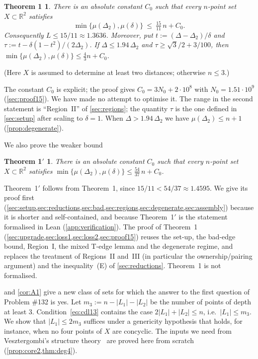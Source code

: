\documentclass[11pt]{amsart}
\newtheorem*{mainthm}{Theorem 1}
\newtheorem*{mainthmp}{Theorem 1$'$}
\theoremstyle{definition}
\theoremstyle{remark}
\newcommand{\R}{\mathbb{R}}
\newcommand{\Dt}{\Delta_2}
\newcommand{\mult}{\mu}
\begin{document}
\begin{mainthm}
There is an absolute constant $C_0$ such that every $n$-point set $X\subset\R^2$ satisfies
\[
\min\{\mult(\Dt),\mult(\delta)\}\ \le\ \tfrac{15}{11}\,n+C_0 .
\]
Consequently $L\le 15/11\approx 1.3636$. Moreover, put $t:=(\Delta-\Dt)/\delta$ and $\tau:=t-\delta(1-t^2)/(2\Dt)$. If $\Delta\le1.94\,\Dt$ and $\tau\ge\sqrt3/2+3/100$, then $\min\{\mult(\Dt),\mult(\delta)\}\le\frac43n+C_0$.
\end{mainthm}
(Here $X$ is assumed to determine at least two distances; otherwise $n\le3$.)

The constant $C_0$ is explicit; the proof gives $C_0=3N_0+2\cdot10^8$ with $N_0=1.51\cdot 10^9$ (\cref{sec:proof15}). We have made no attempt to optimise it. The range in the second statement is ``Region~II'' of \cref{sec:regions}; the quantity $\tau$ is the one defined in \cref{sec:setup} after scaling to $\delta=1$. When $\Delta>1.94\,\Dt$ we have $\mult(\Dt)\le n+1$ (\cref{prop:degenerate}).

We also prove the weaker bound
\begin{mainthmp}
There is an absolute constant $C_0$ such that every $n$-point set $X\subset\R^2$ satisfies $\min\{\mult(\Dt),\mult(\delta)\}\le \tfrac{54}{37}\,n+C_0$.
\end{mainthmp}
Theorem~1$'$ follows from Theorem~1, since $15/11<54/37\approx1.4595$. We give its proof first (\cref{sec:setup,sec:reductions,sec:bad,sec:regions,sec:degenerate,sec:assembly}) because it is shorter and self-contained, and because Theorem~1$'$ is the statement formalised in Lean (\cref{app:verification}). The proof of Theorem~1 (\cref{sec:upgrade,sec:loss1,sec:loss2,sec:proof15}) reuses the set-up, the bad-edge bound, Region~I, the mixed T-edge lemma and the degenerate regime, and replaces the treatment of Regions~II and~III (in particular the ownership/pairing argument) and the inequality~(E) of \cref{sec:reductions}. Theorem~1 is not formalised.

 and \cref{cor:A1} give a new class of sets for which the answer to the first question of Problem \#132 is yes. Let $m_3:=n-|L_1|-|L_2|$ be the number of points of depth at least $3$. Condition~\eqref{eq:cdl13} contains the case $2|L_1|+|L_2|\le n$, i.e.\ $|L_1|\le m_3$. We show that $|L_1|\le 2m_3$ suffices under a genericity hypothesis that holds, for instance, when no four points of $X$ are concyclic. The inputs we need from Vesztergombi's structure theory~\cite{Ve96} are proved here from scratch (\cref{prop:core2,thm:deg4}).
\end{document}
